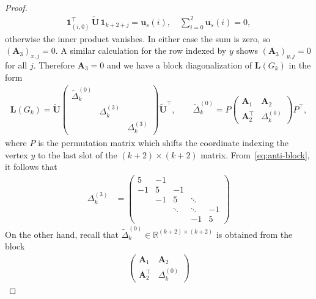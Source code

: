\documentclass[10pt,a4paper]{amsart}
\begin{document}
\begin{proof}
\begin{align*}
            \mathbf{1}_{(i,0)}^\top\,\widetilde{\mathbf{U}}\,\mathbf{1}_{k+2+j}
            = \mathbf{u}_s(i),
            \quad
            \sum_{i=0}^2 \mathbf{u}_s(i)=0,
        \end{align*}
    otherwise the inner product vanishes. In either case the sum is zero, so $(\mathbf{A}_3)_{x,j}=0$.  A similar calculation for the row indexed by $y$ shows $(\mathbf{A}_3)_{y,j}=0$ for all $j$.  Therefore $\mathbf{A}_3=0$ and we have a block diagonalization of $\mathbf{L}(G_k)$ in the form
        \begin{align*}
            \mathbf{L}(G_k) = \widetilde{\mathbf{U}} \begin{pmatrix}
            \widetilde{\Delta}_k^{(0)} & & \\
            & \Delta_k^{(3)} & \\
            & & \Delta_k^{(3)}
        \end{pmatrix} \widetilde{\mathbf{U}}^\top, \qquad \widetilde{\Delta}_k^{(0)} = P\begin{pmatrix}
            \mathbf{A}_1 & \mathbf{A}_2 \\
            \mathbf{A}_2 ^\top & \Delta_k^{(0)}
        \end{pmatrix}P^\top,
        \end{align*}
    where $P$ is the permutation matrix which shifts the coordinate indexing the vertex $y$ to the last slot of the $(k+2)\times (k+2)$ matrix. From~\cref{eq:anti-block}, it follows that
        \begin{align*}
            \Delta_k^{(3)} &= \begin{pmatrix}
            5 & -1 &        &        & \\
            -1& 5  & -1     &        &  \\
            &-1 & 5      & \ddots &  \\
            &   & \ddots & \ddots & -1\\
            &   &        & -1 & 5
            \end{pmatrix}
        \end{align*}
    On the other hand, recall that $\widetilde{\Delta}_k^{(0)} \in\mathbb R^{(k+2)\times(k+2)}$ is obtained from the block
        \begin{align*}
            \begin{pmatrix}
                \mathbf{A}_1 & \mathbf{A}_2\\[2pt]
                \mathbf{A}_2^{\top} & \Delta_k^{(0)}
                \end{pmatrix}

\end{align*}
\end{proof}
\end{document}
